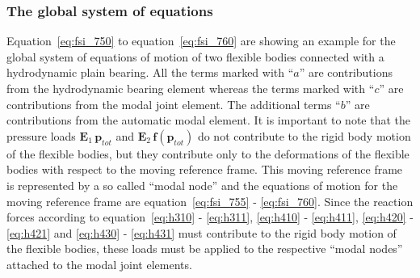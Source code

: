 \subsubsection{The global system of equations}
Equation~\ref{eq:fsi_750} to equation~\ref{eq:fsi_760} are showing an example for the global system of equations of motion of two flexible bodies connected with a hydrodynamic plain bearing.
All the terms marked with ``$a$'' are contributions from the hydrodynamic bearing element whereas the terms marked with ``$c$'' are contributions from the modal joint element.
The additional terms ``$b$'' are contributions from the automatic modal element. It is important to note that the pressure loads $\boldsymbol{E}_1 \, \boldsymbol{p}_{tot}$ and $\boldsymbol{E}_2 \, \boldsymbol{f}\left(\boldsymbol{p}_{tot}\right)$ do not contribute to the rigid body motion of the flexible bodies, but they contribute only to the deformations of the flexible bodies with respect to the moving reference frame. This moving reference frame is represented by a so called ``modal node'' and the equations of motion for the moving reference frame are equation~\ref{eq:fsi_755} - \ref{eq:fsi_760}. Since the reaction forces according to equation~\ref{eq:h310} - \ref{eq:h311}, \ref{eq:h410} - \ref{eq:h411}, \ref{eq:h420} - \ref{eq:h421} and \ref{eq:h430} - \ref{eq:h431} must contribute to the rigid body motion of the flexible bodies, these loads must be applied to the respective ``modal nodes'' attached to the modal joint elements.
